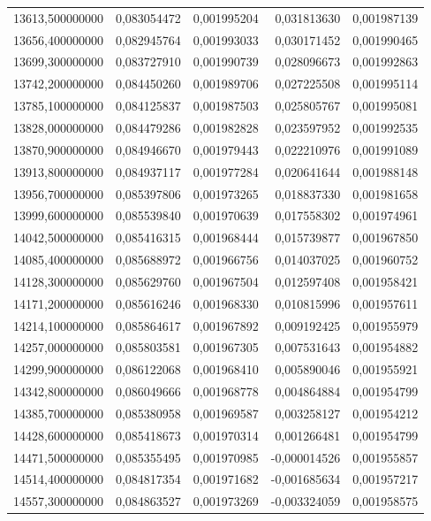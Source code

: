 \begin{longtable}{rrrrr}
13613,500000000 & 0,083054472 & 0,001995204 & 0,031813630 & 0,001987139\\
13656,400000000 & 0,082945764 & 0,001993033 & 0,030171452 & 0,001990465\\
13699,300000000 & 0,083727910 & 0,001990739 & 0,028096673 & 0,001992863\\
13742,200000000 & 0,084450260 & 0,001989706 & 0,027225508 & 0,001995114\\
13785,100000000 & 0,084125837 & 0,001987503 & 0,025805767 & 0,001995081\\
13828,000000000 & 0,084479286 & 0,001982828 & 0,023597952 & 0,001992535\\
13870,900000000 & 0,084946670 & 0,001979443 & 0,022210976 & 0,001991089\\
13913,800000000 & 0,084937117 & 0,001977284 & 0,020641644 & 0,001988148\\
13956,700000000 & 0,085397806 & 0,001973265 & 0,018837330 & 0,001981658\\
13999,600000000 & 0,085539840 & 0,001970639 & 0,017558302 & 0,001974961\\
14042,500000000 & 0,085416315 & 0,001968444 & 0,015739877 & 0,001967850\\
14085,400000000 & 0,085688972 & 0,001966756 & 0,014037025 & 0,001960752\\
14128,300000000 & 0,085629760 & 0,001967504 & 0,012597408 & 0,001958421\\
14171,200000000 & 0,085616246 & 0,001968330 & 0,010815996 & 0,001957611\\
14214,100000000 & 0,085864617 & 0,001967892 & 0,009192425 & 0,001955979\\
14257,000000000 & 0,085803581 & 0,001967305 & 0,007531643 & 0,001954882\\
14299,900000000 & 0,086122068 & 0,001968410 & 0,005890046 & 0,001955921\\
14342,800000000 & 0,086049666 & 0,001968778 & 0,004864884 & 0,001954799\\
14385,700000000 & 0,085380958 & 0,001969587 & 0,003258127 & 0,001954212\\
14428,600000000 & 0,085418673 & 0,001970314 & 0,001266481 & 0,001954799\\
14471,500000000 & 0,085355495 & 0,001970985 & -0,000014526 & 0,001955857\\
14514,400000000 & 0,084817354 & 0,001971682 & -0,001685634 & 0,001957217\\
14557,300000000 & 0,084863527 & 0,001973269 & -0,003324059 & 0,001958575\\

\end{longtable}

